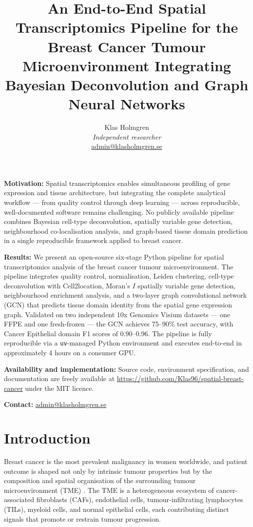 \documentclass[12pt, a4paper]{article}
\title{\textbf{An End-to-End Spatial Transcriptomics Pipeline for the Breast
Cancer Tumour Microenvironment Integrating Bayesian Deconvolution and Graph
Neural Networks}}
\author{Klas Holmgren\\[0.4em]
\small\textit{Independent researcher}\\
\small\href{mailto:admin@klasholmgren.se}{admin@klasholmgren.se}}
\date{}
\begin{document}
\maketitle

\noindent\textbf{Motivation:}
Spatial transcriptomics enables simultaneous profiling of gene expression and
tissue architecture, but integrating the complete analytical workflow --- from
quality control through deep learning --- across reproducible, well-documented
software remains challenging. No publicly available pipeline combines Bayesian
cell-type deconvolution, spatially variable gene detection, neighbourhood
co-localisation analysis, and graph-based tissue domain prediction in a single
reproducible framework applied to breast cancer.

\noindent\textbf{Results:}
We present an open-source six-stage Python pipeline for spatial transcriptomics
analysis of the breast cancer tumour microenvironment. The pipeline integrates
quality control, normalisation, Leiden clustering, cell-type deconvolution with
Cell2location, Moran's $I$ spatially variable gene detection, neighbourhood
enrichment analysis, and a two-layer graph convolutional network (GCN) that
predicts tissue domain identity from the spatial gene expression graph. Validated
on two independent 10x Genomics Visium datasets --- one FFPE and one
fresh-frozen --- the GCN achieves 75--90\% test accuracy, with Cancer Epithelial
domain F1 scores of 0.90--0.96. The pipeline is fully reproducible via a
\texttt{uv}-managed Python environment and executes end-to-end in approximately
4 hours on a consumer GPU.

\noindent\textbf{Availability and implementation:}
Source code, environment specification, and documentation are freely available at
\url{https://github.com/Klas96/spatial-breast-cancer} under the MIT licence.

\noindent\textbf{Contact:} \href{mailto:admin@klasholmgren.se}{admin@klasholmgren.se}

\newpage
\tableofcontents
\newpage

\section{Introduction}

Breast cancer is the most prevalent malignancy in women worldwide, and patient
outcome is shaped not only by intrinsic tumour properties but by the composition
and spatial organisation of the surrounding tumour microenvironment
(TME) \citep{wu2021}. The TME is a heterogeneous ecosystem of cancer-associated
fibroblasts (CAFs), endothelial cells, tumour-infiltrating lymphocytes (TILs),
myeloid cells, and normal epithelial cells, each contributing distinct signals
that promote or restrain tumour progression.
\end{document}
